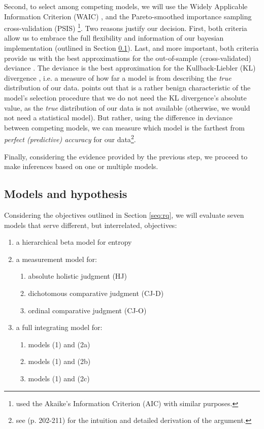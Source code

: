 Second, to select among competing models, we will use the Widely Applicable Information Criterion (WAIC) \citep{Watanabe_2013}, and the Pareto-smoothed importance sampling cross-validation (PSIS) \citep{Vehtari_et_al_2021}\footnote{\citet{vanDaal_2020} used the Akaike’s Information Criterion (AIC) \citep{Akaike_1974} with similar purposes.}. Two reasons justify our decision. First, both criteria allow us to embrace the full flexibility and information of our bayesian implementation (outlined in Section \ref{s_sect:models}). Last, and more important, both criteria provide us with the best approximations for the out-of-sample (cross-validated) deviance \citep{McElreath_2020}. The deviance is the best approximation for the Kullback-Liebler (KL) divergence \citep{Kullback_et_al_1951}, i.e. a measure of how far a model is from describing the \textit{true} distribution of our data. \citet{McElreath_2020} points out that is a rather benign characteristic of the model's selection procedure that we do not need the KL divergence's absolute value, as the \textit{true} distribution of our data is not available (otherwise, we would not need a statistical model). But rather, using the difference in deviance between competing models, we can measure which model is the farthest from \textit{perfect (predictive) accuracy} for our data\footnote{see \citet{McElreath_2020} (p. 202-211) for the intuition and detailed derivation of the argument.}.

Finally, considering the evidence provided by the previous step, we proceed to make inferences based on one or multiple models.
%
%
\subsection{Models and hypothesis} \label{s_sect:models}
%
Considering the objectives outlined in Section \ref{seq:rq}, we will evaluate seven models that serve different, but interrelated, objectives:
%
\begin{enumerate} \itemsep1pt
	\item[(1)] a hierarchical beta model for entropy
	\item[(2)] a measurement model for: 
	\begin{enumerate} \itemsep1pt
		\item absolute holistic judgment (HJ)
		\item dichotomous comparative judgment (CJ-D)
		\item ordinal comparative judgment (CJ-O)
	\end{enumerate}
	\item[(3)] a full integrating model for: 
	\begin{enumerate} \itemsep1pt
		\item models (1) and (2a)
		\item models (1) and (2b)
		\item models (1) and (2c)
	\end{enumerate}
\end{enumerate} 
%
%
